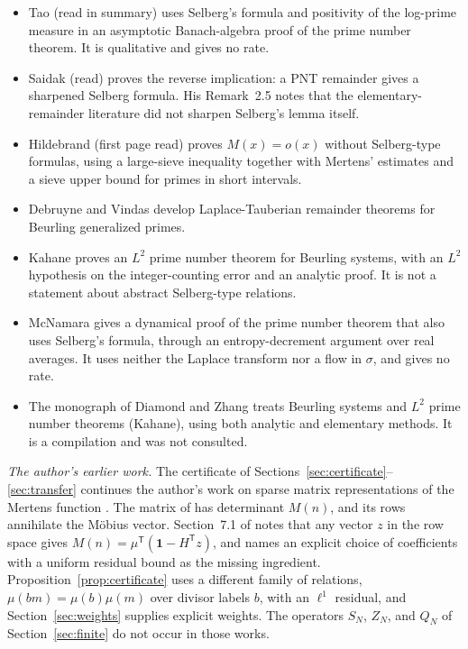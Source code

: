\documentclass[11pt,letterpaper]{article}
\numberwithin{equation}{section}
\theoremstyle{definition}
\theoremstyle{remark}
\begin{document}
\begin{itemize}
 \item Tao \cite{tao} (read in summary) uses Selberg's formula and
       positivity of the log-prime measure in an asymptotic Banach-algebra
       proof of the prime number theorem. It is qualitative and gives no
       rate.
 \item Saidak \cite{saidak} (read) proves the reverse implication: a PNT
       remainder gives a sharpened Selberg formula. His Remark~2.5 notes
       that the elementary-remainder literature did not sharpen Selberg's
       lemma itself.
 \item Hildebrand \cite{hildebrand} (first page read) proves $M(x)=o(x)$
       without Selberg-type formulas, using a large-sieve inequality
       together with Mertens' estimates and a sieve upper bound for primes
       in short intervals.
 \item Debruyne and Vindas \cite{dv} develop Laplace-Tauberian remainder
       theorems for Beurling generalized primes.
 \item Kahane \cite{kahane} proves an $L^2$ prime number theorem for
       Beurling systems, with an $L^2$ hypothesis on the integer-counting
       error and an analytic proof. It is not a statement about abstract
       Selberg-type relations.
 \item McNamara \cite{mcnamara} gives a dynamical proof of the prime
       number theorem that also uses Selberg's formula, through an
       entropy-decrement argument over real averages. It uses neither
       the Laplace transform nor a flow in $\sigma$, and gives no rate.
 \item The monograph of Diamond and Zhang \cite{diamond-zhang} treats
       Beurling systems and $L^2$ prime number theorems (Kahane), using both
       analytic and elementary methods. It is a compilation and was not
       consulted.
\end{itemize}

\emph{The author's earlier work.} The certificate of
Sections~\ref{sec:certificate}--\ref{sec:transfer} continues the author's
work on sparse matrix representations of the Mertens function
\cite{kline2019,kline2020,kline2020b,kline-sv,kline-ss}. The matrix of
\cite{kline2019} has determinant $M(n)$, and its rows annihilate the
M\"obius vector. Section~7.1 of \cite{kline-ss} notes that any vector $z$
in the row space gives $M(n)=\mu^{\mathsf T}(\mathbf 1-H^{\mathsf T}z)$, and
names an explicit choice of coefficients with a uniform residual bound as
the missing ingredient. Proposition~\ref{prop:certificate} uses a
different family of relations, $\mu(bm)=\mu(b)\mu(m)$ over divisor labels
$b$, with an $\ell^1$ residual, and Section~\ref{sec:weights} supplies
explicit weights. The operators $S_N$, $Z_N$, and $Q_N$ of
Section~\ref{sec:finite} do not occur in those works.
\end{document}
